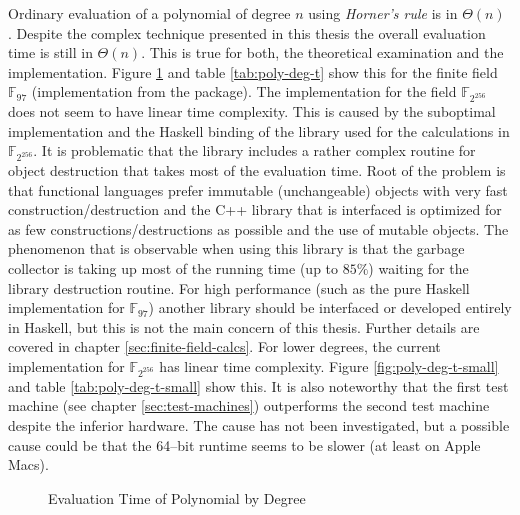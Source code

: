 %
%
\label{sec:comp-complexity}

Ordinary evaluation of a polynomial of degree $n$ using \emph{Horner's rule} is
in $\Theta(n)$ \cite{cormen01}. Despite the complex technique presented in this
thesis the overall evaluation time is still in $\Theta(n)$. This is true for
both, the theoretical examination and the implementation. Figure
\ref{fig:poly-deg-t} and table \ref{tab:poly-deg-t} show this for the finite
field $\mathbb{F}_{97}$ (implementation from the \JWTLhaskellForMaths{}
package). The implementation for the field $\mathbb{F}_{2^{256}}$ does not seem
to have linear time complexity. This is caused by the suboptimal implementation
and the Haskell binding of the library used for the calculations in
$\mathbb{F}_{2^{256}}$. It is problematic that the library includes a rather
complex routine for object destruction that takes most of the evaluation time.
Root of the problem is that functional languages prefer immutable (unchangeable)
objects with very fast construction/destruction and the C++ library that is
interfaced is optimized for as few constructions/destructions as possible and
the use of mutable objects. The phenomenon that is observable when using this
library is that the garbage collector is taking up most of the running time (up
to $85\%$) waiting for the library destruction routine. For high performance
(such as the pure Haskell implementation for $\mathbb{F}_{97}$) another library
should be interfaced or developed entirely in Haskell, but this is not the main
concern of this thesis. Further details are covered in chapter
\ref{sec:finite-field-calcs}. For lower degrees, the current implementation for
$\mathbb{F}_{2^{256}}$ has linear time complexity. Figure
\ref{fig:poly-deg-t-small} and table \ref{tab:poly-deg-t-small} show this. It is
also noteworthy that the first test machine (see chapter
\ref{sec:test-machines}) outperforms the second test machine despite the
inferior hardware. The cause has not been investigated, but a possible cause
could be that the 64--bit \JWTghc{} runtime seems to be slower (at least on
Apple Macs)\cite{lentczner11}.


\begin{figure}[ht]
  \centering
  
  \caption{Evaluation Time of Polynomial by Degree}
  \label{fig:poly-deg-t}
\end{figure}

